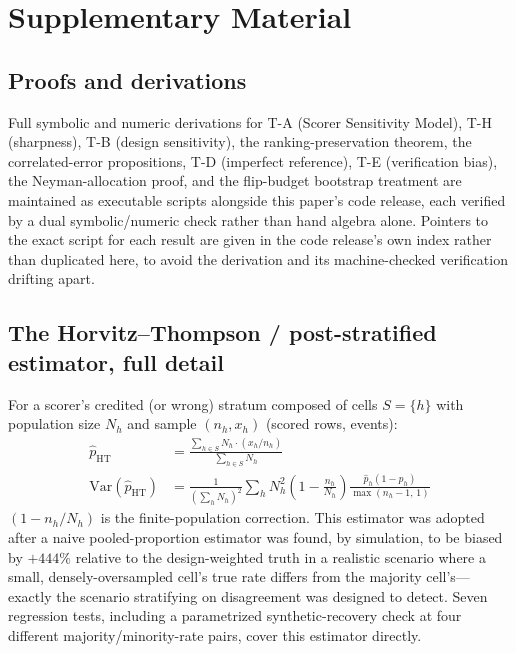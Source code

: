 \section{Supplementary Material}
\label{sec:appendix}

\subsection{Proofs and derivations}
\label{sec:appendix-proofs}

Full symbolic and numeric derivations for T-A (Scorer Sensitivity Model),
T-H (sharpness), T-B (design sensitivity), the ranking-preservation theorem,
the correlated-error propositions, T-D (imperfect reference), T-E
(verification bias), the Neyman-allocation proof, and the flip-budget
bootstrap treatment are maintained as executable scripts alongside this
paper's code release, each verified by a dual symbolic/numeric check rather
than hand algebra alone. Pointers to the exact script for each result are
given in the code release's own index rather than duplicated here, to avoid
the derivation and its machine-checked verification drifting apart.

\subsection{The Horvitz--Thompson / post-stratified estimator, full detail}
\label{sec:appendix-ht}

For a scorer's credited (or wrong) stratum composed of cells $S=\{h\}$ with
population size $N_h$ and sample $(n_h, x_h)$ (scored rows, events):
\begin{align}
  \hat{p}_{\mathrm{HT}} &= \frac{\sum_{h \in S} N_h \cdot (x_h/n_h)}{\sum_{h \in S} N_h} \\
  \mathrm{Var}(\hat{p}_{\mathrm{HT}}) &= \frac{1}{\left(\sum_h N_h\right)^2}
    \sum_h N_h^2 \left(1 - \frac{n_h}{N_h}\right) \frac{\hat{p}_h(1-\hat{p}_h)}{\max(n_h-1,\,1)}
\end{align}
$(1-n_h/N_h)$ is the finite-population correction. This estimator was
adopted after a naive pooled-proportion estimator was found, by simulation,
to be biased by $+444\%$ relative to the design-weighted truth in a
realistic scenario where a small, densely-oversampled cell's true rate
differs from the majority cell's---exactly the scenario stratifying on
disagreement was designed to detect. Seven regression tests, including a
parametrized synthetic-recovery check at four different
majority/minority-rate pairs, cover this estimator directly.

